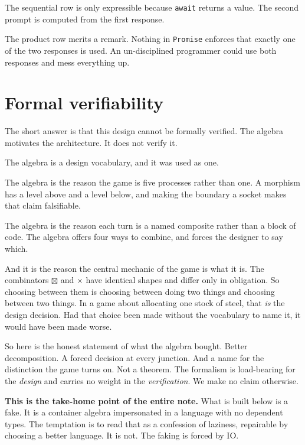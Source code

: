 \documentclass[11pt,a4paper]{article}
\begin{document}
The sequential row is only expressible because \texttt{await} returns a value. The second prompt is
computed from the first response.

The product row merits a remark. Nothing in \texttt{Promise} enforces that exactly one of the two
responses is used. An un-disciplined programmer could use both responses and mess
everything up.

\newpage

\section{Formal verifiability}
\label{sec:enforcement}

The short answer is that this design cannot be formally verified. The algebra motivates the
architecture. It does not verify it.

The algebra is a design vocabulary, and it was used as one.

The algebra is the reason the game is five processes rather than one. A morphism has a level above and a
level below, and making the boundary a socket makes that claim falsifiable.

The algebra is the reason each turn is a named composite rather than a block of code. The algebra offers
four ways to combine, and forces the designer to say which.

And it is the reason the central mechanic of the game is what it is. The combinators $\boxtimes$ and $\times$ have
identical shapes and differ only in obligation. So choosing between them is choosing between doing
two things and choosing between two things. In a game about allocating one stock of steel, that
\emph{is} the design decision. Had that choice been made without the vocabulary to name it, it
would have been made worse.

So here is the honest statement of what the algebra bought. Better decomposition. A forced decision
at every junction. And a name for the distinction the game turns on. Not a theorem. The formalism
is load-bearing for the \emph{design} and carries no weight in the \emph{verification}. We make no
claim otherwise.

\begin{sectionbox}
\textbf{This is the take-home point of the entire note.} What is built below is a fake. It is a
container algebra impersonated in a language with no dependent types. The temptation is to read
that as a confession of laziness, repairable by choosing a better language. It is not. The faking
is forced by IO.
\end{sectionbox}
\end{document}
